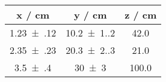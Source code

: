 \documentclass{scrartcl}
\begin{document}
\begin{tabular}{ccc}\toprule
x / cm & y / cm & z / cm\\ 
\midrule
\num{1.23(12)} & \num{10.2(1.2)} & 42.0\\
\num{2.35(23)} & \num{20.3(2.3)} & 21.0\\
\num{3.5(4)} & \num{30(3)} & 100.0\\
\bottomrule
\end{tabular}
\end{document}
